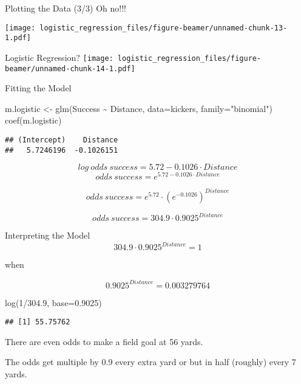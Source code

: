 \documentclass[
  ignorenonframetext,
]{beamer}
\newenvironment{Shaded}{\begin{snugshade}}{\end{snugshade}}
\newcommand{\AttributeTok}[1]{\textcolor[rgb]{0.77,0.63,0.00}{#1}}
\newcommand{\DecValTok}[1]{\textcolor[rgb]{0.00,0.00,0.81}{#1}}
\newcommand{\FloatTok}[1]{\textcolor[rgb]{0.00,0.00,0.81}{#1}}
\newcommand{\FunctionTok}[1]{\textcolor[rgb]{0.00,0.00,0.00}{#1}}
\newcommand{\NormalTok}[1]{#1}
\newcommand{\OtherTok}[1]{\textcolor[rgb]{0.56,0.35,0.01}{#1}}
\newcommand{\SpecialCharTok}[1]{\textcolor[rgb]{0.00,0.00,0.00}{#1}}
\newcommand{\StringTok}[1]{\textcolor[rgb]{0.31,0.60,0.02}{#1}}
\begin{document}
\begin{frame}{Plotting the Data (3/3)}
\protect\hypertarget{plotting-the-data-33}{}
Oh no!!!

\texttt{[image: logistic\_regression\_files/figure-beamer/unnamed-chunk-13-1.pdf]}
\end{frame}

\begin{frame}{Logistic Regression?}
\protect\hypertarget{logistic-regression}{}
\texttt{[image: logistic\_regression\_files/figure-beamer/unnamed-chunk-14-1.pdf]}
\end{frame}

\begin{frame}[fragile]{Fitting the Model}
\protect\hypertarget{fitting-the-model}{}
\begin{Shaded}
\begin{Highlighting}[]
\NormalTok{m.logistic }\OtherTok{\textless{}{-}} \FunctionTok{glm}\NormalTok{(Success }\SpecialCharTok{\textasciitilde{}}\NormalTok{ Distance, }\AttributeTok{data=}\NormalTok{kickers, }\AttributeTok{family=}\StringTok{"binomial"}\NormalTok{)}
\FunctionTok{coef}\NormalTok{(m.logistic)}
\end{Highlighting}
\end{Shaded}

\begin{verbatim}
## (Intercept)    Distance 
##   5.7246196  -0.1026151
\end{verbatim}

\[log\ odds\ success = 5.72 - 0.1026 \cdot Distance\]
\[ odds\ success = e^{5.72 - 0.1026 \cdot Distance}\]

\[ odds\ success = e^{5.72} \cdot (e^{-0.1026})^{Distance} \]

\[ odds\ success = 304.9 \cdot 0.9025^{Distance}\]
\end{frame}

\begin{frame}[fragile]{Interpreting the Model}
\protect\hypertarget{interpreting-the-model}{}
\[304.9 \cdot 0.9025^{Distance} = 1\]

when

\[ 0.9025^{Distance} = 0.003279764\]

\begin{Shaded}
\begin{Highlighting}[]
\FunctionTok{log}\NormalTok{(}\DecValTok{1}\SpecialCharTok{/}\FloatTok{304.9}\NormalTok{, }\AttributeTok{base=}\FloatTok{0.9025}\NormalTok{)}
\end{Highlighting}
\end{Shaded}

\begin{verbatim}
## [1] 55.75762
\end{verbatim}

There are even odds to make a field goal at 56 yards.

The odds get multiple by 0.9 every extra yard or but in half (roughly)
every 7 yards.
\end{frame}
\end{document}
